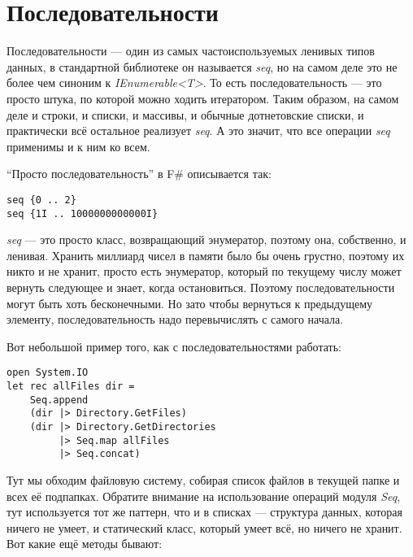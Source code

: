 \documentclass[a5paper]{article}
\begin{document}
\section{Последовательности}

Последовательности --- один из самых частоиспользуемых ленивых типов данных, в стандартной библиотеке он называется \textit{seq}, но на самом деле это не более чем синоним к \textit{IEnumerable<T>}. То есть последовательность --- это просто штука, по которой можно ходить итератором. Таким образом, на самом деле и строки, и списки, и массивы, и обычные дотнетовские списки, и практически всё остальное реализует \textit{seq}. А это значит, что все операции \textit{seq} применимы и к ним ко всем.

``Просто последовательность'' в F\# описывается так:

\begin{verbatim}
seq {0 .. 2}
seq {1I .. 1000000000000I}
\end{verbatim}

\textit{seq} --- это просто класс, возвращающий энумератор, поэтому она, собственно, и ленивая. Хранить миллиард чисел в памяти было бы очень грустно, поэтому их никто и не хранит, просто есть энумератор, который по текущему числу может вернуть следующее и знает, когда остановиться. Поэтому последовательности могут быть хоть бесконечными. Но зато чтобы вернуться к предыдущему элементу, последовательность надо перевычислять с самого начала.

Вот небольшой пример того, как с последовательностями работать:

\begin{verbatim}
open System.IO
let rec allFiles dir =
    Seq.append
    (dir |> Directory.GetFiles)
    (dir |> Directory.GetDirectories 
         |> Seq.map allFiles 
         |> Seq.concat)
\end{verbatim}

Тут мы обходим файловую систему, собирая список файлов в текущей папке и всех её подпапках. Обратите внимание на использование операций модуля \textit{Seq}, тут используется тот же паттерн, что и в списках --- структура данных, которая ничего не умеет, и статический класс, который умеет всё, но ничего не хранит. Вот какие ещё методы бывают:
\end{document}
